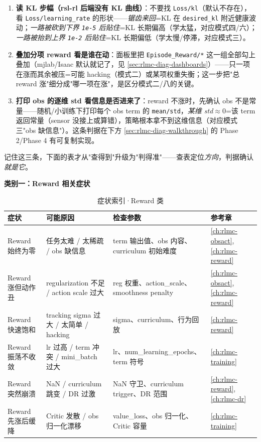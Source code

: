 \begin{enumerate}
  \item \textbf{读 KL 步幅（rsl-rl 后端没有 KL 曲线）}：不要找 \verb|Loss/kl|（默认不存在），看 \verb|Loss/learning_rate| 的形状——\emph{锯齿来回}=KL 在 \verb|desired_kl| 附近健康波动；\emph{一路被砍到下界 \texttt{1e-5} 后贴住}=KL 长期偏高（学太猛，对应模式四/六）；\emph{一路被抬到上界 \texttt{1e-2} 后贴住}=KL 长期偏低（学太慢/停滞，对应模式三）。
  \item \textbf{叠加分项 reward 看是谁在动}：面板里把 \verb|Episode_Reward/*| 这一组全部勾上叠加（mjlab/Isaac 默认就记了，见 \cref{sec:rlmc-diag-dashboards}）——只一项在涨而其余被压=可能 hacking（模式二）或某项权重失衡；这一步把"总 reward 涨"细分成"哪一项在涨"，是区分模式二/八的关键。
  \item \textbf{打印 obs 的逐维 std 看信息是否进来了}：reward 不涨时，先确认 obs 不是常量——随机/小训练下打印每个 obs term 的 \verb|mean/std|，\emph{某维 std$\approx 0$}=该 term 返回常量（sensor 没接上或算错），策略根本拿不到这维信息（对应模式三"obs 缺信息"）。这条判据在下方 \cref{sec:rlmc-diag-walkthrough} 的 Phase 2/Phase 4 有可复制实现。
\end{enumerate}

记住这三条，下面的表才从"查得到"升级为"判得准"——查表定位\emph{方向}，判据确认\emph{就是它}。

\textbf{类别一：Reward 相关症状}

\begin{table}[H]
\centering
\caption{症状索引·Reward 类}
\label{tab:rlmc-diag-idx-reward}
\begin{tabular}{p{3.4cm}p{3.8cm}p{3.4cm}p{2.0cm}}
\hline
症状 & 可能原因 & 检查参数 & 参考章 \\
\hline
Reward 始终为零 & 任务太难 / 太稀疏 / obs 缺信息 & term 输出值、obs 内容、curriculum 初始难度 & \cref{ch:rlmc-obsact},\cref{ch:rlmc-reward} \\
Reward 涨但动作丑 & regularization 不足 / action scale 过大 & reg 权重、action\_scale、smoothness penalty & \cref{ch:rlmc-obsact},\cref{ch:rlmc-reward} \\
Reward 快速饱和 & tracking sigma 过大 / 太简单 / hacking & sigma、curriculum、行为回放 & \cref{ch:rlmc-reward} \\
Reward 振荡不收敛 & lr 过高 / term 冲突 / mini\_batch 过大 & lr、num\_learning\_epochs、term 符号 & \cref{ch:rlmc-training} \\
Reward 突然崩溃 & NaN / curriculum 跳变 / DR 过激 & NaN 守卫、curriculum trigger、DR 范围 & \cref{ch:rlmc-reward},\cref{ch:rlmc-dr} \\
Reward 先涨后缓降 & Critic 发散 / obs 归一化漂移 & value\_loss、obs 归一化、Critic 容量 & \cref{ch:rlmc-training} \\
\hline
\end{tabular}
\end{table}

